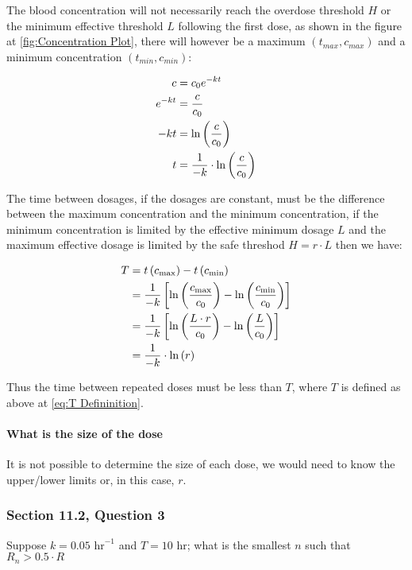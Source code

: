 The blood concentration will not necessarily reach the overdose threshold $H$ or the minimum effective threshold $L$ following the first dose, as shown in the figure at \ref{fig:Concentration Plot}, there will however be a maximum  $\left( t_{\textit{max}}, c_\textit{max}  \right)$ and a minimum concentration $\left( t_{\textit{min}}, c_{\textit{min}} \right)$:

\begin{align}
  c&= c_0e^{-kt}\notag \\ 
  e^{-kt} &= \frac{c}{c_0}\notag \\ 
  -kt &=  \ln{  \left( \frac{c}{c_0} \right)}\notag \\ 
  t &= \frac{1}{-k} \cdot   \ln{  \left( \frac{c}{c_0} \right)}\notag \\ 
\end{align}

The time between dosages, if the dosages are constant, must be the difference between the maximum concentration and the minimum concentration, if the minimum concentration is limited by the effective minimum dosage $L$ and the maximum effective dosage is limited by the safe threshod $H= r\cdot  L$ then we have:

\begin{align}
  T &= t\left( c_{\text{max}}  \right) - t\left( c_{\text{min}} \right)\notag \\ 
  &= \frac{1}{-k}\left[ \ln{ \left( \frac{c_{\text{max}}}{c_0} \right) - \ln{ \left( \frac{c_{\text{min}}}{c_0} \right) } } \right]\notag \\ 
  &= \frac{1}{-k}\left[ \ln{ \left( \frac{L\cdot  r}{c_0} \right) - \ln{ \left( \frac{L}{c_0} \right) } } \right]\notag \\ 
  &= \frac{1}{-k}\cdot  \ln{ \left( r \right) } \label{eq:T Defininition}
\end{align}


Thus the time between repeated doses must be less than $T$, where $T$ is defined as above at \eqref{eq:T Defininition}.



\paragraph{What is the size of the dose}
It is not possible to determine the size of each dose, we would need to know the upper/lower limits or, in this case, $r$.

\subsubsection{Section 11.2, Question 3}
Suppose $k = 0.05 \text{ hr}^{- 1}$ and $T = 10 \text{ hr}$; what is the smallest $n$ such that $R_n>0.5\cdot  R$

